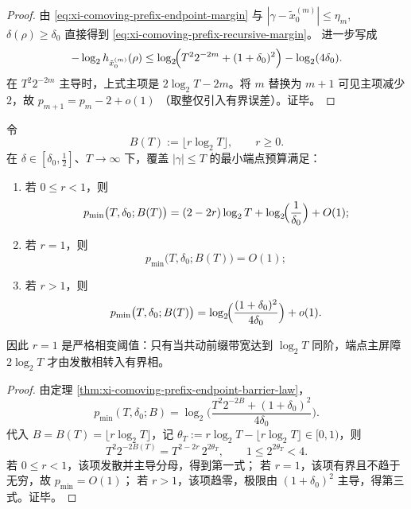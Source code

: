 \begin{proof}
由 \eqref{eq:xi-comoving-prefix-endpoint-margin} 与
\(
|\gamma-\tilde x_0^{(m)}|\le \eta_m
\),
\(
\delta(\rho)\ge\delta_0
\)
直接得到 \eqref{eq:xi-comoving-prefix-recursive-margin}。
进一步写成
\[
-\log_2 h_{\tilde x_0^{(m)}}(\rho)
\le
\log_2\!\Bigl(T^2 2^{-2m}+(1+\delta_0)^2\Bigr)
-\log_2(4\delta_0).
\]
在 \(T^2 2^{-2m}\) 主导时，上式主项是 \(2\log_2 T-2m\)。将 \(m\) 替换为 \(m+1\) 可见主项减少 \(2\)，故
\(
p_{m+1}=p_m-2+o(1)
\)
（取整仅引入有界误差）。证毕。
\end{proof}

\begin{proposition}[共动前缀速率的相变阈值]\label{prop:xi-comoving-prefix-rate-phase-transition}
令
\[
B(T):=\lfloor r\log_2 T\rfloor,\qquad r\ge 0.
\]
在 \(\delta\in[\delta_0,\tfrac12]\)、\(T\to\infty\) 下，覆盖 \(|\gamma|\le T\) 的最小端点预算满足：
\begin{enumerate}
  \item 若 \(0\le r<1\)，则
  \[
  p_{\min}\bigl(T,\delta_0;B(T)\bigr)
  =
  (2-2r)\log_2 T+\log_2\!\Bigl(\frac1{\delta_0}\Bigr)+O(1);
  \]
  \item 若 \(r=1\)，则
  \[
  p_{\min}\bigl(T,\delta_0;B(T)\bigr)=O(1);
  \]
  \item 若 \(r>1\)，则
  \[
  p_{\min}\bigl(T,\delta_0;B(T)\bigr)
  =
  \log_2\!\Bigl(\frac{(1+\delta_0)^2}{4\delta_0}\Bigr)+o(1).
  \]
\end{enumerate}
因此 \(r=1\) 是严格相变阈值：只有当共动前缀带宽达到 \(\log_2 T\) 同阶，端点主屏障 \(2\log_2 T\) 才由发散相转入有界相。
\end{proposition}

\begin{proof}
由定理 \ref{thm:xi-comoving-prefix-endpoint-barrier-law}，
\[
p_{\min}(T,\delta_0;B)
=
\log_2\!\Biggl(
\frac{T^2 2^{-2B}+(1+\delta_0)^2}{4\delta_0}
\Biggr).
\]
代入 \(B=B(T)=\lfloor r\log_2T\rfloor\)，记
\(
\theta_T:=r\log_2T-\lfloor r\log_2T\rfloor\in[0,1)
\)，则
\[
T^2 2^{-2B(T)}
=
T^{2-2r}\,2^{2\theta_T},
\qquad
1\le 2^{2\theta_T}<4.
\]
若 \(0\le r<1\)，该项发散并主导分母，得到第一式；
若 \(r=1\)，该项有界且不趋于无穷，故 \(p_{\min}=O(1)\)；
若 \(r>1\)，该项趋零，极限由 \((1+\delta_0)^2\) 主导，得第三式。证毕。
\end{proof}

